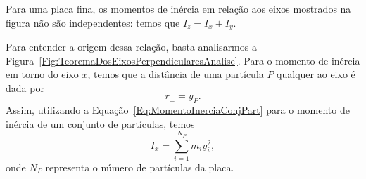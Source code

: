 \begin{marginfigure}
\centering
{}
\caption{Para uma placa fina, os momentos de inércia em relação aos eixos mostrados na figura não são independentes: temos que $I_z = I_x + I_y$. \label{Fig:TeoremaDosEixosPerpendicularesPlaca}}
\end{marginfigure}

Para entender a origem dessa relação, basta analisarmos a Figura~\ref{Fig:TeoremaDosEixosPerpendicularesAnalise}. Para o momento de inércia em torno do eixo $x$, temos que a distância de uma partícula $P$ qualquer ao eixo é dada por
\begin{equation}
    r_\perp = y_P.
\end{equation}
%
Assim, utilizando a Equação~\eqref{Eq:MomentoInerciaConjPart} para o momento de inércia de um conjunto de partículas, temos
\begin{equation}
    I_x = \sum_{i = 1}^{N_P} m_i y_i^2,
\end{equation}
%
onde $N_P$ representa o número de partículas da placa.

